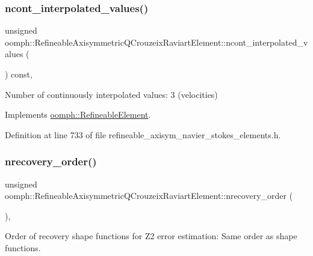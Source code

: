 \subsubsection{\texorpdfstring{ncont\+\_\+interpolated\+\_\+values()}{ncont\_interpolated\_values()}}
{\footnotesize\ttfamily unsigned oomph\+::\+Refineable\+Axisymmetric\+Q\+Crouzeix\+Raviart\+Element\+::ncont\+\_\+interpolated\+\_\+values (\begin{DoxyParamCaption}{ }\end{DoxyParamCaption}) const\hspace{0.3cm}{\ttfamily [inline]}, {\ttfamily [virtual]}}



Number of continuously interpolated values\+: 3 (velocities) 



Implements \hyperlink{classoomph_1_1RefineableElement_a53e171a18c9f43f1db90a6876516a073}{oomph\+::\+Refineable\+Element}.



Definition at line 733 of file refineable\+\_\+axisym\+\_\+navier\+\_\+stokes\+\_\+elements.\+h.

\mbox{\label{classoomph_1_1RefineableAxisymmetricQCrouzeixRaviartElement_a644f9d24915f1fb952b8746581f69ee3}} 
\subsubsection{\texorpdfstring{nrecovery\+\_\+order()}{nrecovery\_order()}}
{\footnotesize\ttfamily unsigned oomph\+::\+Refineable\+Axisymmetric\+Q\+Crouzeix\+Raviart\+Element\+::nrecovery\+\_\+order (\begin{DoxyParamCaption}{ }\end{DoxyParamCaption})\hspace{0.3cm}{\ttfamily [inline]}, {\ttfamily [virtual]}}



Order of recovery shape functions for Z2 error estimation\+: Same order as shape functions. 



